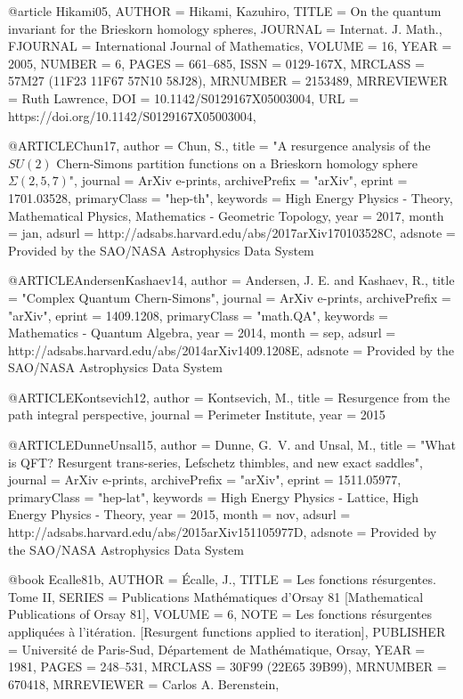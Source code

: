 @article {Hikami05,
    AUTHOR = {Hikami, Kazuhiro},
     TITLE = {On the quantum invariant for the {B}rieskorn homology spheres},
   JOURNAL = {Internat. J. Math.},
  FJOURNAL = {International Journal of Mathematics},
    VOLUME = {16},
      YEAR = {2005},
    NUMBER = {6},
     PAGES = {661--685},
      ISSN = {0129-167X},
   MRCLASS = {57M27 (11F23 11F67 57N10 58J28)},
  MRNUMBER = {2153489},
MRREVIEWER = {Ruth Lawrence},
       DOI = {10.1142/S0129167X05003004},
       URL = {https://doi.org/10.1142/S0129167X05003004},
}

@ARTICLE{Chun17,
   author = {{Chun}, S.},
    title = "{A resurgence analysis of the $SU(2)$ Chern-Simons partition functions on a Brieskorn homology sphere $\Sigma(2,5,7)$}",
  journal = {ArXiv e-prints},
archivePrefix = "arXiv",
   eprint = {1701.03528},
 primaryClass = "hep-th",
 keywords = {High Energy Physics - Theory, Mathematical Physics, Mathematics - Geometric Topology},
     year = 2017,
    month = jan,
   adsurl = {http://adsabs.harvard.edu/abs/2017arXiv170103528C},
  adsnote = {Provided by the SAO/NASA Astrophysics Data System}
}

@ARTICLE{AndersenKashaev14,
   author = {{Andersen}, J. E. and {Kashaev}, R.},
    title = "{Complex Quantum Chern-Simons}",
  journal = {ArXiv e-prints},
archivePrefix = "arXiv",
   eprint = {1409.1208},
 primaryClass = "math.QA",
 keywords = {Mathematics - Quantum Algebra},
     year = 2014,
    month = sep,
   adsurl = {http://adsabs.harvard.edu/abs/2014arXiv1409.1208E},
  adsnote = {Provided by the SAO/NASA Astrophysics Data System}
}

@ARTICLE{Kontsevich12,
  author = {Kontsevich, M.},
  title = {Resurgence from the path integral perspective},
  journal = {Perimeter Institute},
  year = {2015}
}

@ARTICLE{DunneUnsal15,
   author = {{Dunne}, G.~V. and {Unsal}, M.},
    title = "{What is QFT? Resurgent trans-series, Lefschetz thimbles, and new exact saddles}",
  journal = {ArXiv e-prints},
archivePrefix = "arXiv",
   eprint = {1511.05977},
 primaryClass = "hep-lat",
 keywords = {High Energy Physics - Lattice, High Energy Physics - Theory},
     year = 2015,
    month = nov,
   adsurl = {http://adsabs.harvard.edu/abs/2015arXiv151105977D},
  adsnote = {Provided by the SAO/NASA Astrophysics Data System}
}

@book {Ecalle81b,
    AUTHOR = {\'{E}calle, J.},
     TITLE = {Les fonctions r\'{e}surgentes. {T}ome {II}},
    SERIES = {Publications Math\'{e}matiques d'Orsay 81 [Mathematical
              Publications of Orsay 81]},
    VOLUME = {6},
      NOTE = {Les fonctions r\'{e}surgentes appliqu\'{e}es \`a l'it\'{e}ration. [Resurgent
              functions applied to iteration]},
 PUBLISHER = {Universit\'{e} de Paris-Sud, D\'{e}partement de Math\'{e}matique, Orsay},
      YEAR = {1981},
     PAGES = {248--531},
   MRCLASS = {30F99 (22E65 39B99)},
  MRNUMBER = {670418},
MRREVIEWER = {Carlos A. Berenstein},
}

